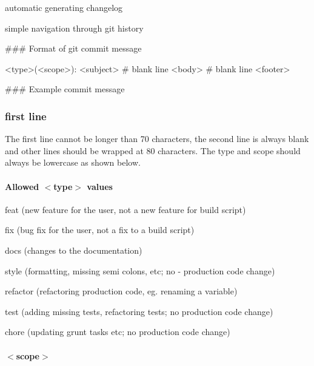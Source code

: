 \begin{DoxyItemize}
\item automatic generating changelog
\item simple navigation through git history
\end{DoxyItemize}

\#\#\# Format of git commit message 
\begin{DoxyCode}
<type>(<scope>): <subject>
# blank line
<body>
# blank line
<footer>
\end{DoxyCode}
 \#\#\# Example commit message 
 \subsubsection*{first line}

The first line cannot be longer than 70 characters, the second line is always blank and other lines should be wrapped at 80 characters. The type and scope should always be lowercase as shown below. \paragraph*{Allowed $<$type$>$ values}


\begin{DoxyItemize}
\item feat (new feature for the user, not a new feature for build script)
\item fix (bug fix for the user, not a fix to a build script)
\item docs (changes to the documentation)
\item style (formatting, missing semi colons, etc; no -\/ production code change)
\item refactor (refactoring production code, eg. renaming a variable)
\item test (adding missing tests, refactoring tests; no production code change)
\item chore (updating grunt tasks etc; no production code change)
\end{DoxyItemize}

\paragraph*{$<$scope$>$}

